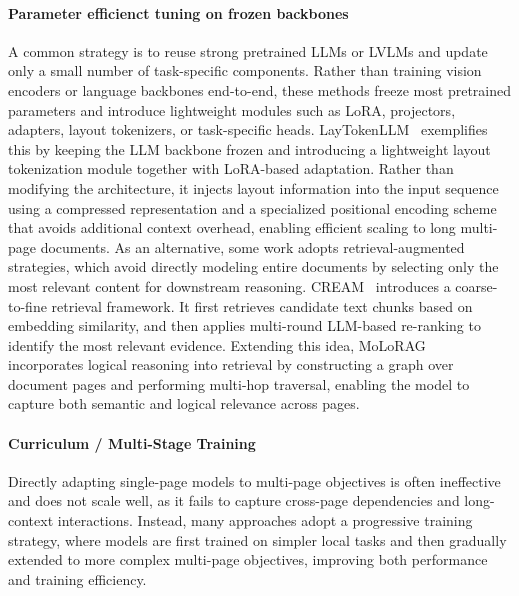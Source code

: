 \documentclass[11pt]{article}
\begin{document}
\paragraph{Parameter efficienct tuning on frozen backbones}
A common strategy is to reuse strong pretrained LLMs or LVLMs and update only a small number of task-specific components. Rather than training vision encoders or language backbones end-to-end, these methods freeze most pretrained parameters and introduce lightweight modules such as LoRA, projectors, adapters, layout tokenizers, or task-specific heads. 
LayTokenLLM~\cite{Zhu2025-jb-laytokenllm} exemplifies this by keeping the LLM backbone frozen and introducing a lightweight layout tokenization module together with LoRA-based adaptation. Rather than modifying the architecture, it injects layout information into the input sequence using a compressed representation and a specialized positional encoding scheme that avoids additional context overhead, enabling efficient scaling to long multi-page documents. As an alternative, some work adopts retrieval-augmented strategies, which avoid directly modeling entire documents by selecting only the most relevant content for downstream reasoning. CREAM~\cite{Zhang2024-zs-cream} introduces a coarse-to-fine retrieval framework. It first retrieves candidate text chunks based on embedding similarity, and then applies multi-round LLM-based re-ranking to identify the most relevant evidence. Extending this idea, MoLoRAG~\cite{Wu2025-mi-molorag} incorporates logical reasoning into retrieval by constructing a graph over document pages and performing multi-hop traversal, enabling the model to capture both semantic and logical relevance across pages.


\paragraph{Curriculum / Multi-Stage Training}
Directly adapting single-page models to multi-page objectives is often ineffective and does not scale well, as it fails to capture cross-page dependencies and long-context interactions.%
Instead, many approaches adopt a progressive training strategy, where models are first trained on simpler local tasks and then gradually extended to more complex multi-page objectives, improving both performance and training efficiency.
\end{document}
